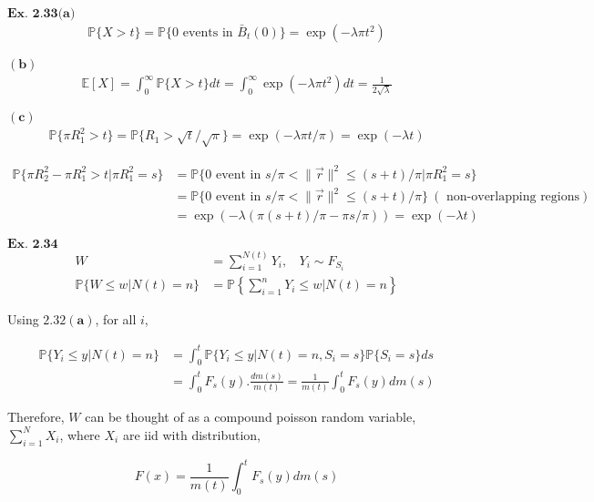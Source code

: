 \documentclass{article}
\begin{document}
\vspace{0.2in}
${\textbf{Ex. 2.33(a)}}$
\begin{align*}
\mathbb{P}\{X>t \} = \mathbb{P}\{0 \text{ events in } \bar{B}_{t}(0)\} = \exp(-\lambda \pi t^2)
\end{align*}

$\mathbf{(b)}$
\begin{align*}
\mathbb{E}[X] = \int_{0}^{\infty}\mathbb{P}\{X>t\}dt = \int_{0}^{\infty}\exp(-\lambda \pi t^2)dt = \frac{1}{2\sqrt{\lambda}}
\end{align*}

$\mathbf{(c)}$
\begin{align*}
\mathbb{P}\{\pi R_1^2 > t\} = \mathbb{P}\{R_1 > \sqrt{t}/\sqrt{\pi}\} = \exp(-\lambda \pi t/\pi) = \exp(-\lambda t)
\end{align*}

\begin{align*}
\mathbb{P}\{\pi R_2^2 -\pi R_1^2 >t |\pi R_1^2 = s\} &= \mathbb{P}\{0 \text{ event in } s/\pi < \|\vec{r}\|^2 \leq (s+t)/\pi|\pi R_1^2=s\}\\
&= \mathbb{P}\{0 \text{ event in } s/\pi < \|\vec{r}\|^2 \leq (s+t)/\pi\} \
 (\text{ non-overlapping regions})\\
&= \exp(-\lambda(\pi(s+t)/\pi - \pi s/\pi)) = \exp(-\lambda t)
\end{align*}

\vspace{0.2in}
${\textbf{Ex. 2.34}}$
\begin{align*}
W &= \sum_{i=1}^{N(t)}Y_i, \ \ \ \ Y_{i}\sim F_{S_{i}}\\
\mathbb{P}\{W \leq w|N(t)=n\} &= \mathbb{P}\left\{\sum_{i=1}^{n}Y_i \leq w\bigg\vert N(t)=n\right\}
\end{align*}

Using $\mathbf{2.32(a)}$, for all $i$,

\begin{align*}
\mathbb{P}\{Y_i \leq y|N(t)=n\} &= \int_{0}^{t}\mathbb{P}\{Y_i \leq y|N(t)=n, S_i=s\}\mathbb{P}\{S_i=s\}ds\\
&= \int_{0}^{t}F_{s}(y).\frac{dm(s)}{m(t)} = \frac{1}{m(t)}\int_{0}^{t}F_{s}(y)dm(s)
\end{align*}

Therefore, $W$ can be thought of as a compound poisson random variable, $\sum_{i=1}^{N}X_i$, where $X_i$ are iid with distribution,

$$
F(x) = \frac{1}{m(t)}\int_{0}^{t}F_{s}(y)dm(s)
$$
\end{document}
